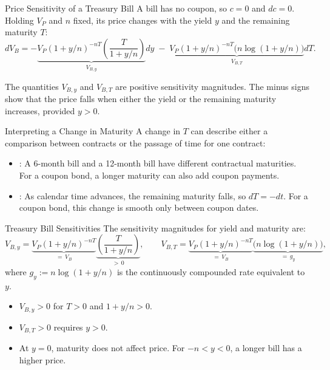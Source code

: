 \documentclass[aspectratio=169,11pt]{beamer}
\begin{document}
\begin{frame}{Price Sensitivity of a Treasury Bill}
  \vspace{0.2em}
  A bill has no coupon, so $c=0$ and $dc=0$. Holding $V_P$ and $n$ fixed, its
  price changes with the yield $y$ and the remaining maturity $T$:
  \[
    dV_B
    =-\underbrace{V_P\left(1+y/n\right)^{-nT}\left(\frac{T}{1+y/n}\right)}_{V_{B,y}}dy
    \;-\;\underbrace{V_P\left(1+y/n\right)^{-nT}\bigl(n\log\left(1+y/n\right)\bigr)}_{V_{B,T}}dT .
  \]

  \vspace{0.4em}
  The quantities $V_{B,y}$ and $V_{B,T}$ are positive sensitivity magnitudes.
  The minus signs show that the price falls when either the yield or the
  remaining maturity increases, provided $y>0$.

\end{frame}

\begin{frame}{Interpreting a Change in Maturity}
  \vspace{0.3em}
  A change in $T$ can describe either a comparison between contracts or the
  passage of time for one contract:

  \vspace{0.6em}
  \begin{itemize}\setlength{\itemsep}{0.55em}
    \item {}: A 6-month bill and a 12-month bill have
      different contractual maturities. For a coupon bond, a longer maturity can
      also add coupon payments.
    \item {}: As calendar time advances, the
      remaining maturity falls, so $dT=-dt$. For a coupon bond, this change is
      smooth only between coupon dates.
  \end{itemize}

\end{frame}

\begin{frame}{Treasury Bill Sensitivities}
  \vspace{-0.3em}
  The sensitivity magnitudes for yield and maturity are:
  \[
    V_{B,y}=\underbrace{V_P(1+y/n)^{-nT}}_{=\,V_B}\underbrace{\left(\frac{T}{1+y/n}\right)}_{>\,0},
    \qquad
    V_{B,T}=\underbrace{V_P(1+y/n)^{-nT}}_{=\,V_B}\underbrace{\bigl(n\log(1+y/n)\bigr)}_{=\,g_y},
  \]
  where $g_y:=n\log(1+y/n)$ is the continuously compounded rate equivalent to
  $y$.

  \vspace{0.3em}
  \begin{itemize}\setlength{\itemsep}{0.25em}
    \item $V_{B,y}>0$ for $T>0$ and $1+y/n>0$.
    \item $V_{B,T}>0$ requires $y>0$.
    \item At $y=0$, maturity does not affect price. For $-n<y<0$, a longer bill
      has a higher price.
  \end{itemize}

\end{frame}
\end{document}
